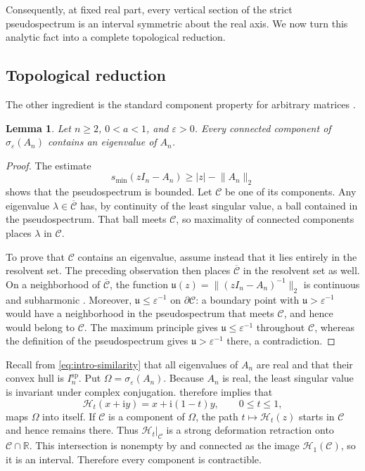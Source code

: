 \documentclass[a4paper,preprint,12pt,nopreprintline,sort&compress]{elsarticle}
\numberwithin{equation}{section}
\newtheorem{lemma}[theorem]{Lemma}
\theoremstyle{remark}
\newcommand{\R}{\mathbb R}
\newcommand{\ii}{\mathrm i}
\begin{document}
Consequently, at fixed real part, every vertical section of the strict
pseudospectrum is an interval symmetric about the real axis.  We now turn
this analytic fact into a complete topological reduction.

\subsection{Topological reduction}\label{sec:topological-reduction}

The other ingredient is the standard component property for arbitrary
matrices \cite{BurkeLewisOverton2003}.

\begin{lemma}\label{lem:component}
Let \(n\geq2\), \(0<a<1\), and \(\varepsilon>0\).  Every connected
component of \(\sigma_\varepsilon(A_n)\) contains an
eigenvalue of \(A_n\).
\end{lemma}

\begin{proof}
The estimate
\[
 s_{\min}(zI_n-A_n)\geq |z|-\lVert A_n\rVert_2
\]
shows that the pseudospectrum is bounded.  Let \(\mathcal C\) be one of its
components.  Any eigenvalue
\(\lambda\in\overline{\mathcal C}\) has, by continuity of the least singular
value, a ball contained in the pseudospectrum.  That ball meets
\(\mathcal C\), so maximality of connected components places \(\lambda\) in
\(\mathcal C\).

To prove that \(\mathcal C\) contains an eigenvalue, assume instead that it
lies entirely in the resolvent set.  The preceding observation then places
\(\overline{\mathcal C}\) in the resolvent set as well.  On a neighborhood
of \(\overline{\mathcal C}\), the function
\(\mathfrak u(z)=\lVert(zI_n-A_n)^{-1}\rVert_2\) is continuous and
subharmonic \cite{TrefethenEmbree2005}.  Moreover,
\(\mathfrak u\leq\varepsilon^{-1}\) on \(\partial\mathcal C\): a boundary
point with \(\mathfrak u>\varepsilon^{-1}\) would have a neighborhood in
the pseudospectrum that meets \(\mathcal C\), and hence would belong to
\(\mathcal C\).  The maximum principle gives
\(\mathfrak u\leq\varepsilon^{-1}\) throughout \(\mathcal C\), whereas the
definition of the pseudospectrum gives
\(\mathfrak u>\varepsilon^{-1}\) there, a contradiction.
\end{proof}

Recall from \eqref{eq:intro-similarity} that all eigenvalues of \(A_n\) are
real and that their convex hull is \(I_n^{\mathrm{sp}}\).
Put \(\Omega=\sigma_\varepsilon(A_n)\).
Because \(A_n\) is real, the least singular value is invariant under
complex conjugation.   therefore implies that
\[
 \mathcal H_t(x+\ii y)=x+\ii(1-t)y,\qquad0\leq t\leq1,
\]
maps \(\Omega\) into itself.  If \(\mathcal C\) is a component of
\(\Omega\), the path \(t\mapsto\mathcal H_t(z)\) starts in
\(\mathcal C\) and hence remains there.  Thus
\(\mathcal H_t|_{\mathcal C}\) is a strong deformation retraction onto
\(\mathcal C\cap\R\).  This intersection is nonempty by
 and connected as the image
\(\mathcal H_1(\mathcal C)\), so it is an interval.  Therefore every
component is contractible.
\end{document}
